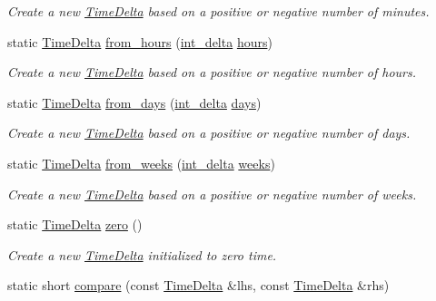 \begin{DoxyCompactItemize}
\begin{DoxyCompactList}\small\item\em Create a new \hyperlink{structTimeDelta}{Time\-Delta} based on a positive or negative number of minutes. \end{DoxyCompactList}\item 
static \hyperlink{structTimeDelta}{Time\-Delta} \hyperlink{structTimeDelta_a912f6ceafac4b9252a1a5d76033754ea}{from\-\_\-hours} (\hyperlink{types_8h_a8a67cf99971c5cfeeaa2380ba84a4c92}{int\-\_\-delta} \hyperlink{structTimeDelta_a5135596cbf7f7ef40001e25c5aa880b3}{hours})
\begin{DoxyCompactList}\small\item\em Create a new \hyperlink{structTimeDelta}{Time\-Delta} based on a positive or negative number of hours. \end{DoxyCompactList}\item 
static \hyperlink{structTimeDelta}{Time\-Delta} \hyperlink{structTimeDelta_a9bb1a85b6f27ad8488ae06e238d5808e}{from\-\_\-days} (\hyperlink{types_8h_a8a67cf99971c5cfeeaa2380ba84a4c92}{int\-\_\-delta} \hyperlink{structTimeDelta_abad8a94a6c022af1a1871e452eca47ea}{days})
\begin{DoxyCompactList}\small\item\em Create a new \hyperlink{structTimeDelta}{Time\-Delta} based on a positive or negative number of days. \end{DoxyCompactList}\item 
static \hyperlink{structTimeDelta}{Time\-Delta} \hyperlink{structTimeDelta_ae0f0a41d899e62b9d17bc4542c443ec6}{from\-\_\-weeks} (\hyperlink{types_8h_a8a67cf99971c5cfeeaa2380ba84a4c92}{int\-\_\-delta} \hyperlink{structTimeDelta_a4e583a79abea664691df4680f4fd467d}{weeks})
\begin{DoxyCompactList}\small\item\em Create a new \hyperlink{structTimeDelta}{Time\-Delta} based on a positive or negative number of weeks. \end{DoxyCompactList}\item 
static \hyperlink{structTimeDelta}{Time\-Delta} \hyperlink{structTimeDelta_a2dec837a107c5e46e14b9c69557209fa}{zero} ()
\begin{DoxyCompactList}\small\item\em Create a new \hyperlink{structTimeDelta}{Time\-Delta} initialized to zero time. \end{DoxyCompactList}\item 
static short \hyperlink{structTimeDelta_a01a8c83b6a7430e4ff09f22499b0ec73}{compare} (const \hyperlink{structTimeDelta}{Time\-Delta} \&lhs, const \hyperlink{structTimeDelta}{Time\-Delta} \&rhs)

\end{DoxyCompactItemize}
